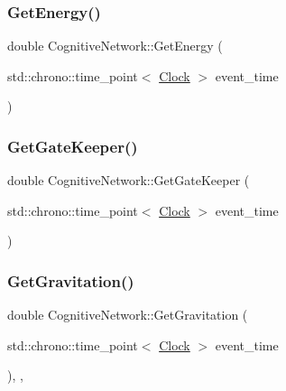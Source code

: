 \mbox{\label{classCognitiveNetwork_af23b9bce2587ccf3c8204be33fc76c61}} 
\subsubsection{\texorpdfstring{Get\+Energy()}{GetEnergy()}}
{\footnotesize\ttfamily double Cognitive\+Network\+::\+Get\+Energy (\begin{DoxyParamCaption}\item[{std\+::chrono\+::time\+\_\+point$<$ \mbox{\hyperlink{universe_8h_a0ef8d951d1ca5ab3cfaf7ab4c7a6fd80}{Clock}} $>$}]{event\+\_\+time }\end{DoxyParamCaption})\hspace{0.3cm}{\ttfamily [inline]}}

\mbox{\label{classCognitiveNetwork_a3a9be1c6697d063b0836cdcdc7a2600c}} 
\subsubsection{\texorpdfstring{Get\+Gate\+Keeper()}{GetGateKeeper()}}
{\footnotesize\ttfamily double Cognitive\+Network\+::\+Get\+Gate\+Keeper (\begin{DoxyParamCaption}\item[{std\+::chrono\+::time\+\_\+point$<$ \mbox{\hyperlink{universe_8h_a0ef8d951d1ca5ab3cfaf7ab4c7a6fd80}{Clock}} $>$}]{event\+\_\+time }\end{DoxyParamCaption})\hspace{0.3cm}{\ttfamily [inline]}}

\mbox{\label{classCognitiveNetwork_a4b5150310288c52f00ecb745ae9e7f86}} 
\subsubsection{\texorpdfstring{Get\+Gravitation()}{GetGravitation()}}
{\footnotesize\ttfamily double Cognitive\+Network\+::\+Get\+Gravitation (\begin{DoxyParamCaption}\item[{std\+::chrono\+::time\+\_\+point$<$ \mbox{\hyperlink{universe_8h_a0ef8d951d1ca5ab3cfaf7ab4c7a6fd80}{Clock}} $>$}]{event\+\_\+time }\end{DoxyParamCaption})\hspace{0.3cm}{\ttfamily [inline]}, {\ttfamily [final]}, {\ttfamily [virtual]}}



